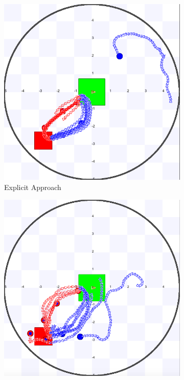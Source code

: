 \documentclass[letterpaper, 10 pt, conference]{ieeeconf}  %
\begin{document}
\begin{figure}[h]
  \begin{subfigure}{.25\textwidth}
      \includegraphics[width=0.9\linewidth]{images/explicit/1/raw/8.png}
         \centering
         \caption{Explicit Approach}
   \end{subfigure}%
     \begin{subfigure}{.25\textwidth}
       \includegraphics[width=0.9\linewidth]{images/embodied/1/raw/8.png}

\end{subfigure}
\end{figure}
\end{document}
